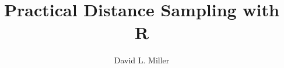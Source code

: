 \documentclass[graybox,envcountchap,sectrefs]{svmono}
\begin{document}
\author{David L. Miller}
\title{Practical Distance Sampling with R}
\maketitle

\frontmatter%

%
%
%
%


%


\mainmatter%

%
%
%

\backmatter%
%
%



\printindex

\end{document}
